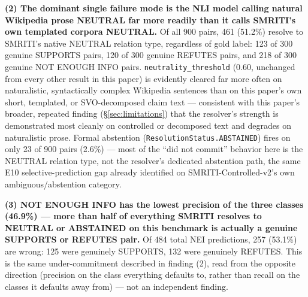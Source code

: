 \textbf{(2) The dominant single failure mode is the NLI model calling
natural Wikipedia prose NEUTRAL far more readily than it calls SMRITI's
own templated corpora NEUTRAL.} Of all 900 pairs, 461 (51.2\%) resolve
to SMRITI's native NEUTRAL relation type, regardless of gold label: 123
of 300 genuine SUPPORTS pairs, 120 of 300 genuine REFUTES pairs, and 218
of 300 genuine NOT ENOUGH INFO pairs. \texttt{neutrality\_threshold}
(0.60, unchanged from every other result in this paper) is evidently
cleared far more often on naturalistic, syntactically complex Wikipedia
sentences than on this paper's own short, templated, or SVO-decomposed
claim text --- consistent with this paper's broader, repeated finding
(\S\ref{sec:limitations}) that the resolver's strength is demonstrated
most cleanly on controlled or decomposed text and degrades on
naturalistic prose. Formal abstention (\texttt{ResolutionStatus.ABSTAINED})
fires on only 23 of 900 pairs (2.6\%) --- most of the ``did not commit''
behavior here is the NEUTRAL relation type, not the resolver's dedicated
abstention path, the same E10 selective-prediction gap already
identified on SMRITI-Controlled-v2's own ambiguous/abstention category.

\textbf{(3) NOT ENOUGH INFO has the lowest precision of the three
classes (46.9\%) --- more than half of everything SMRITI resolves to
NEUTRAL or ABSTAINED on this benchmark is actually a genuine SUPPORTS or
REFUTES pair.} Of 484 total NEI predictions, 257 (53.1\%) are wrong: 125
were genuinely SUPPORTS, 132 were genuinely REFUTES. This is the same
under-commitment described in finding (2), read from the opposite
direction (precision on the class everything defaults to, rather than
recall on the classes it defaults away from) --- not an independent
finding.

